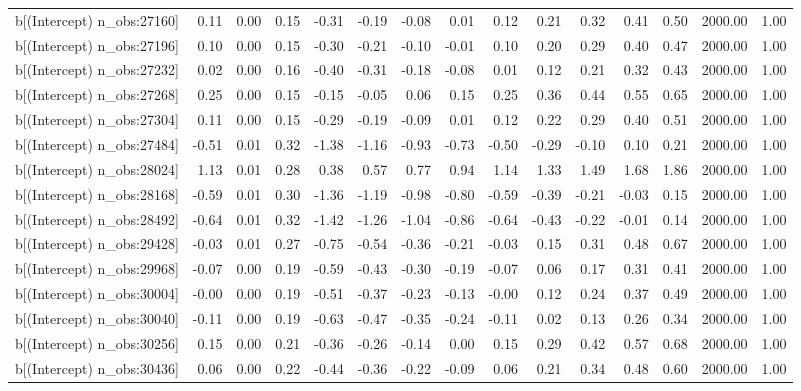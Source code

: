 \begin{table}[ht]
\begin{tabular}{rrrrrrrrrrrrrrr}
  b[(Intercept) n\_obs:27160] & 0.11 & 0.00 & 0.15 & -0.31 & -0.19 & -0.08 & 0.01 & 0.12 & 0.21 & 0.32 & 0.41 & 0.50 & 2000.00 & 1.00 \\ 
  b[(Intercept) n\_obs:27196] & 0.10 & 0.00 & 0.15 & -0.30 & -0.21 & -0.10 & -0.01 & 0.10 & 0.20 & 0.29 & 0.40 & 0.47 & 2000.00 & 1.00 \\ 
  b[(Intercept) n\_obs:27232] & 0.02 & 0.00 & 0.16 & -0.40 & -0.31 & -0.18 & -0.08 & 0.01 & 0.12 & 0.21 & 0.32 & 0.43 & 2000.00 & 1.00 \\ 
  b[(Intercept) n\_obs:27268] & 0.25 & 0.00 & 0.15 & -0.15 & -0.05 & 0.06 & 0.15 & 0.25 & 0.36 & 0.44 & 0.55 & 0.65 & 2000.00 & 1.00 \\ 
  b[(Intercept) n\_obs:27304] & 0.11 & 0.00 & 0.15 & -0.29 & -0.19 & -0.09 & 0.01 & 0.12 & 0.22 & 0.29 & 0.40 & 0.51 & 2000.00 & 1.00 \\ 
  b[(Intercept) n\_obs:27484] & -0.51 & 0.01 & 0.32 & -1.38 & -1.16 & -0.93 & -0.73 & -0.50 & -0.29 & -0.10 & 0.10 & 0.21 & 2000.00 & 1.00 \\ 
  b[(Intercept) n\_obs:28024] & 1.13 & 0.01 & 0.28 & 0.38 & 0.57 & 0.77 & 0.94 & 1.14 & 1.33 & 1.49 & 1.68 & 1.86 & 2000.00 & 1.00 \\ 
  b[(Intercept) n\_obs:28168] & -0.59 & 0.01 & 0.30 & -1.36 & -1.19 & -0.98 & -0.80 & -0.59 & -0.39 & -0.21 & -0.03 & 0.15 & 2000.00 & 1.00 \\ 
  b[(Intercept) n\_obs:28492] & -0.64 & 0.01 & 0.32 & -1.42 & -1.26 & -1.04 & -0.86 & -0.64 & -0.43 & -0.22 & -0.01 & 0.14 & 2000.00 & 1.00 \\ 
  b[(Intercept) n\_obs:29428] & -0.03 & 0.01 & 0.27 & -0.75 & -0.54 & -0.36 & -0.21 & -0.03 & 0.15 & 0.31 & 0.48 & 0.67 & 2000.00 & 1.00 \\ 
  b[(Intercept) n\_obs:29968] & -0.07 & 0.00 & 0.19 & -0.59 & -0.43 & -0.30 & -0.19 & -0.07 & 0.06 & 0.17 & 0.31 & 0.41 & 2000.00 & 1.00 \\ 
  b[(Intercept) n\_obs:30004] & -0.00 & 0.00 & 0.19 & -0.51 & -0.37 & -0.23 & -0.13 & -0.00 & 0.12 & 0.24 & 0.37 & 0.49 & 2000.00 & 1.00 \\ 
  b[(Intercept) n\_obs:30040] & -0.11 & 0.00 & 0.19 & -0.63 & -0.47 & -0.35 & -0.24 & -0.11 & 0.02 & 0.13 & 0.26 & 0.34 & 2000.00 & 1.00 \\ 
  b[(Intercept) n\_obs:30256] & 0.15 & 0.00 & 0.21 & -0.36 & -0.26 & -0.14 & 0.00 & 0.15 & 0.29 & 0.42 & 0.57 & 0.68 & 2000.00 & 1.00 \\ 
  b[(Intercept) n\_obs:30436] & 0.06 & 0.00 & 0.22 & -0.44 & -0.36 & -0.22 & -0.09 & 0.06 & 0.21 & 0.34 & 0.48 & 0.60 & 2000.00 & 1.00 \\ 

\end{tabular}
\end{table}
